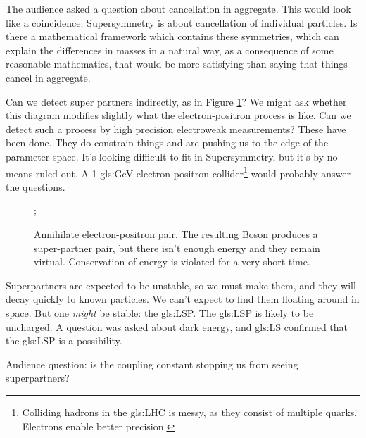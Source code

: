\documentclass[]{article}
\begin{document}
The audience asked a question about cancellation in aggregate. This would look like a coincidence: Supersymmetry is about cancellation of individual particles. Is there a mathematical framework which contains these symmetries, which can explain the differences in masses in a natural way, as a consequence of some reasonable mathematics, that would be more satisfying than saying that things cancel in aggregate.

Can we detect super partners indirectly, as in Figure \ref{fig:particles3-2-superpartners}? We might ask whether this diagram modifies slightly what the electron-positron process is like. Can we detect such a process by high precision electroweak measurements? These have been done. They do constrain things and are pushing us to the edge of the parameter space. It's looking difficult to fit in Supersymmetry, but it's by no means ruled out. A 1 \gls{gls:GeV} electron-positron collider\footnote{Colliding hadrons in the \gls{gls:LHC} is messy, as they consist of multiple quarks. Electrons enable better precision.} would probably answer the questions. 

\begin{figure}[H]
	\begin{center}
		\caption[Annihilate electron-positron pair]{Annihilate electron-positron pair. The resulting Boson produces a super-partner pair, but there isn't enough energy and they remain virtual. Conservation of energy is violated for a very short time.}\label{fig:particles3-2-superpartners}
		;
	\end{center}
\end{figure}

Superpartners are expected to be unstable, so we must make them, and they will decay quickly to known particles. We can't expect to find them floating around in space. But one \emph{might} be stable: the \glsdesc{gls:LSP}. The \gls{gls:LSP} is likely to be uncharged. A question was asked about dark energy, and \gls{gls:LS} confirmed that the \gls{gls:LSP} is a possibility.

Audience question: is the coupling constant stopping us from seeing superpartners?
\end{document}
